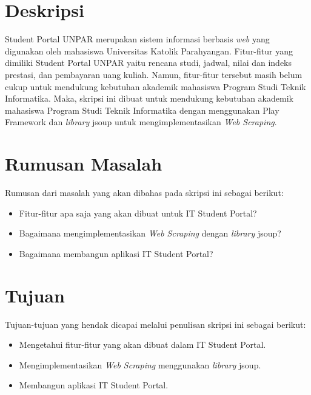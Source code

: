 \documentclass[a4paper,twoside]{article}
\begin{document}
\title{\@judultopik}
\author{\nama \textendash \@npm} 

\newcommand{\nama}{Herfan Heryandi}
\newcommand{\@npm}{2012730012}
\newcommand{\@judultopik}{IT Student Portal: Pemanfaatan \textit{Web Scraping} untuk Kustomisasi Student Portal UNPAR} %
\newcommand{\jumpemb}{1} %
\newcommand{\tanggal}{26/08/2015}
\maketitle


\section{Deskripsi}
Student Portal UNPAR merupakan sistem informasi berbasis \textit{web} yang digunakan oleh mahasiswa Universitas Katolik Parahyangan. Fitur-fitur yang dimiliki Student Portal UNPAR yaitu rencana studi, jadwal, nilai dan indeks prestasi, dan pembayaran uang kuliah. Namun, fitur-fitur tersebut masih belum cukup untuk mendukung kebutuhan akademik mahasiswa Program Studi Teknik Informatika. Maka, skripsi ini dibuat untuk mendukung kebutuhan akademik mahasiswa Program Studi Teknik Informatika dengan menggunakan Play Framework dan \textit{library} jsoup untuk mengimplementasikan \textit{Web Scraping}.

\section{Rumusan Masalah}
Rumusan dari masalah yang akan dibahas pada skripsi ini sebagai
berikut:
\begin{itemize}
	\item Fitur-fitur apa saja yang akan dibuat untuk IT Student Portal?
	\item Bagaimana mengimplementasikan \textit{Web Scraping} dengan \textit{library} jsoup?
	\item Bagaimana membangun aplikasi IT Student Portal?
\end{itemize}

\section{Tujuan}
Tujuan-tujuan yang hendak dicapai melalui penulisan skripsi ini sebagai berikut:
\begin{itemize}
	\item	Mengetahui fitur-fitur yang akan dibuat dalam IT Student Portal.
	\item	Mengimplementasikan \textit{Web Scraping} menggunakan \textit{library} jsoup.
	\item Membangun aplikasi IT Student Portal.
\end{itemize}
\end{document}
